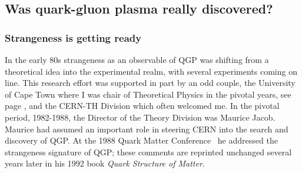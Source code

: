 \subsection{Was quark-gluon plasma really discovered?}
\subsubsection{Strangeness is getting ready}
In the early 80s strangeness as an observable of QGP was shifting from a theoretical idea into the experimental realm, with several experiments coming on line. This research effort was supported in part by an odd couple, the University of Cape Town where I was chair of Theoretical Physics in the pivotal years, see page \pageref{JRVac}, and the CERN-TH Division which often welcomed me. In the pivotal period, 1982-1988, the Director of the Theory Division was Maurice Jacob. Maurice had assumed an important role in steering CERN into the search and discovery of QGP. At the 1988 Quark Matter Conference~\cite{Jacob:1988wt} he addressed the strangeness signature of QGP; these comments are reprinted unchanged several years later in his 1992 book \textit{Quark Structure of Matter}.\\

